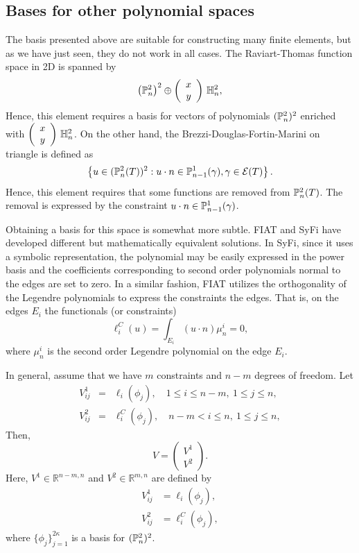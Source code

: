 \subsection{Bases for other polynomial spaces}
The basis presented above are suitable for constructing many finite
elements, but as we have just seen, they do not work in all cases.
The Raviart-Thomas function space in 2D is spanned by
\begin{equation}
\left( \P^2_n \right)^2 \oplus
\left(\begin{array}{c} x \\y \end{array} \right) \, \H^2_n,
\end{equation}
Hence, this element requires a basis for vectors of polynomials
$(\P^2_n)^2$ enriched with $\left(\begin{array}{c} x \\y \end{array}
\right) \, \H^2_n$.  On the other hand, the Brezzi-Douglas-Fortin-Marini
on triangle is defined as
\begin{equation}
\left\{
u \in (\P^2_n (T) )^2 : u \cdot n \in \P^1_{n-1}(\gamma), \gamma \in \mathcal{E}(T)
\right\}.
\end{equation}
Hence, this element requires that some functions are removed from
$\P^2_n (T)$. The removal is expressed by the constraint $u \cdot n
\in \P^1_{n-1}(\gamma)$.

Obtaining a basis for this space is somewhat more subtle.  FIAT and
SyFi have developed different but mathematically equivalent solutions.
In SyFi, since it uses a symbolic representation, the polynomial may be
easily expressed in the power basis and the coefficients corresponding to
second order polynomials normal to the edges are set to zero. In a similar
fashion, FIAT utilizes the orthogonality of the Legendre polynomials
to express the constraints the edges. That is, on the edges $E_i$
the functionals (or constraints)
\begin{equation}
\ell^C_i( u ) = \int_{E_i} (u \cdot n) \mu_n^i = 0,
\end{equation}
where $\mu_n^i$ is the second order Legendre polynomial on the edge $E_i$.


In general, assume that we have $m$ constraints and $n-m$ degrees
of freedom.  Let
\begin{eqnarray}
V^1_{ij} &=& \ell_i( \phi_j ), \quad  1\le i \le n-m, \  1\le j \le n,  \\
V^2_{ij} &=& \ell^C_i( \phi_j ), \quad  n-m  < i \le n, \  1\le j \le n,
\end{eqnarray}
Then,
\begin{equation}
V = \left( \begin{array}{c} V^1 \\ V^2 \end{array} \right).
\end{equation}
Here, $V^1 \in \mathbb{R}^{n-m, n}$ and $V^2 \in \mathbb{R}^{m, n}$
are defined by
\begin{align}
V^1_{ij} &= \ell_i( \phi_j ),
\\
V^2_{ij} &= \ell^C_i( \phi_j ),
\end{align}
where $\{ \phi_j \}_{j=1}^{2 \kappa}$ is a basis for $(\P^2_n)^2$.

